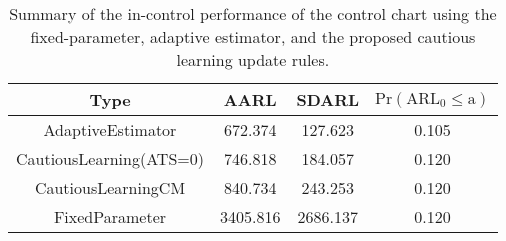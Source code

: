 \begin{table}[!h]

\caption{Summary of the in-control performance of the control chart using the fixed-parameter, adaptive estimator, and the proposed cautious learning update rules.}
\centering
\begin{tabular}[t]{cccc}
\toprule
Type & AARL & SDARL & $\text{Pr}(\text{ARL}_0 \leq \text{a})$\\
\midrule
AdaptiveEstimator & 672.374 & 127.623 & 0.105\\
CautiousLearning(ATS=0) & 746.818 & 184.057 & 0.120\\
CautiousLearningCM & 840.734 & 243.253 & 0.120\\
FixedParameter & 3405.816 & 2686.137 & 0.120\\
\bottomrule
\end{tabular}
\end{table}

